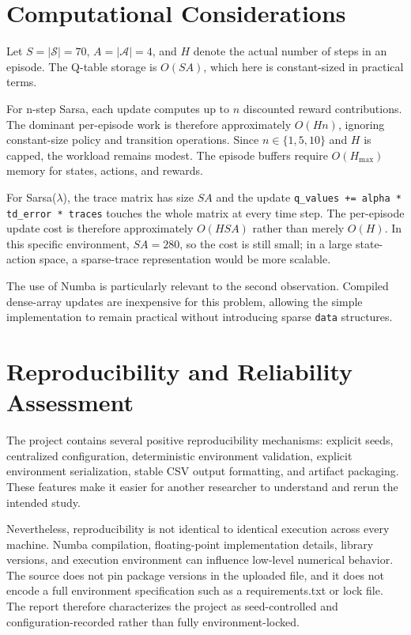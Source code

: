 \documentclass[11pt,a4paper]{article}
\begin{document}
\section{Computational Considerations}
Let $S=|\mathcal{S}|=70$, $A=|\mathcal{A}|=4$, and $H$ denote the actual number of steps in an episode. The Q-table storage is $O(SA)$, which here is constant-sized in practical terms.

For n-step Sarsa, each update computes up to $n$ discounted reward contributions. The dominant per-episode work is therefore approximately $O(Hn)$, ignoring constant-size policy and transition operations. Since $n\in\{1,5,10\}$ and $H$ is capped, the workload remains modest. The episode buffers require $O(H_{\max})$ memory for states, actions, and rewards.

For Sarsa($\lambda$), the trace matrix has size $SA$ and the update \texttt{q\_values += alpha * td\_error * traces} touches the whole matrix at every time step. The per-episode update cost is therefore approximately $O(HSA)$ rather than merely $O(H)$. In this specific environment, $SA=280$, so the cost is still small; in a large state-action space, a sparse-trace representation would be more scalable.

The use of Numba is particularly relevant to the second observation. Compiled dense-array updates are inexpensive for this problem, allowing the simple implementation to remain practical without introducing sparse \texttt{data} structures.

\section{Reproducibility and Reliability Assessment}
The project contains several positive reproducibility mechanisms: explicit seeds, centralized configuration, deterministic environment validation, explicit environment serialization, stable CSV output formatting, and artifact packaging. These features make it easier for another researcher to understand and rerun the intended study.

Nevertheless, reproducibility is not identical to identical execution across every machine. Numba compilation, floating-point implementation details, library versions, and execution environment can influence low-level numerical behavior. The source does not pin package versions in the uploaded file, and it does not encode a full environment specification such as a requirements.txt or lock file. The report therefore characterizes the project as seed-controlled and configuration-recorded rather than fully environment-locked.
\end{document}
